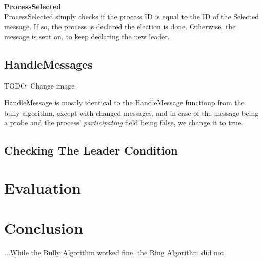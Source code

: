 \documentclass{report}
\begin{document}
\textbf{ProcessSelected}\\
ProcessSelected simply checks if the process ID is equal to the ID of the Selected message. If so, the process is declared the election is done. Otherwise, the message is sent on, to keep declaring the new leader.


\section{HandleMessages}
\noindent{}
TODO: Change image

HandleMessage is mostly identical to the HandleMessage functionp from the bully algorithm, except with changed messages, and in case of the message being a probe and the process' \textit{participating} field being false, we change it to true.

\section{Checking The Leader Condition}



\chapter{Evaluation}



\chapter{Conclusion}

...While the Bully Algorithm worked fine, the Ring Algorithm did not.

\lipsum[3]
\end{document}
